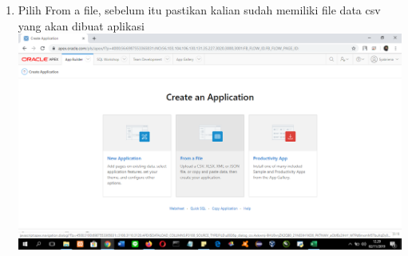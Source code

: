 \begin{enumerate}
\item Pilih From a file, sebelum itu pastikan kalian sudah memiliki file data csv yang akan dibuat aplikasi\\
\includegraphics[scale= 0.3]{gambar/gambar7.png}\\


\end{enumerate}

